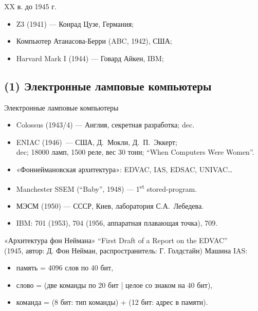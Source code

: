 \begin{frame}{XX в. до 1945 г.}
\pause
\begin{itemize}
    \item Z3 (1941) — Конрад Цузе, Германия;
        \\ 
    \item Компьютер Атанасова-Берри (ABC, 1942), США;
        \\ 

    \item Harvard Mark I (1944) — Говард Айкен, IBM;
        \\ 

\end{itemize}
\end{frame}

\subsection {(1) Электронные ламповые компьютеры}

\begin{frame}{Электронные ламповые компьютеры}
\begin{itemize}[<+->]
    \item Colossus (1943/4) — Англия, секретная разработка; dec.
    \item ENIAC (1946)~— США, Д.~Мокли, Д.~П.~Эккерт; \\
    {\small dec; 18000 ламп, 1500 реле, вес 30 тонн; “When Computers Were Women”.}
    \item «Фоннеймановская архитектура»: {\small EDVAC, IAS, EDSAC, UNIVAC…}
    \item Manchester SSEM (“Baby”, 1948) — 1\textsuperscript{st} stored-program.
    \item МЭСМ (1950) — СССР, Киев, лаборатория С.А.~Лебедева.
    \item IBM: 701 (1953), 704 (1956, аппаратная плавающая точка), 709.
\end{itemize}
\end{frame}

\begin{frame}{«Архитектура фон Неймана»}
“First Draft of a Report on the EDVAC”\\
{\small (1945, автор: Д. Фон Нейман, распространитель: Г. Голдстайн)}
\pause Машина IAS:
\begin{itemize}
    \item память = 4096 слов по 40 бит,
    \item слово = (две команды по 20 бит | целое со знаком на 40 бит),
    \item команда = (8 бит: тип команды) + (12 бит: адрес в памяти).
\end{itemize}
\end{frame}

